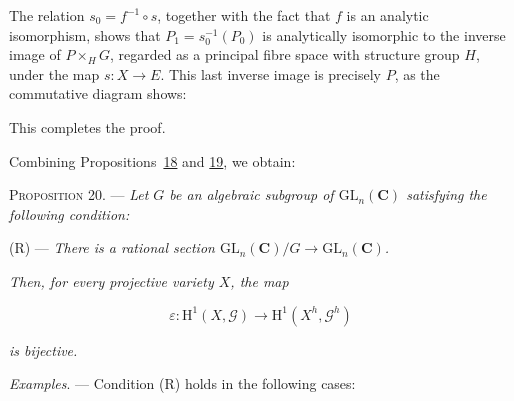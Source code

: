 The relation $s_0=f^{-1}\circ s$, together with the fact that $f$ is an
analytic isomorphism, shows that $P_1=s_0^{-1}(P_0)$ is analytically
isomorphic to the inverse image of $P\times_HG$, regarded as a principal
fibre space with structure group $H$, under the map $s:X\to E$. This last
inverse image is precisely $P$, as the commutative diagram shows:

\begin{center}
\end{center}

This completes the proof.

Combining Propositions~\hyperref[gaga:prop:18]{18} and
\hyperref[gaga:prop:19]{19}, we obtain:

\textsc{Proposition 20}. --- \emph{Let $G$ be an
algebraic subgroup of $\mathrm{GL}_n(\mathbf{C})$ satisfying the following
condition:}

(R) --- \emph{There is a rational section
$\mathrm{GL}_n(\mathbf{C})/G\to\mathrm{GL}_n(\mathbf{C})$.}

\emph{Then, for every projective variety $X$, the map}

\begin{equation*}
\varepsilon:\mathrm{H}^1(X,\mathcal{G})
\longrightarrow\mathrm{H}^1(X^h,\mathcal{G}^h)
\end{equation*}

\emph{is bijective.}

\emph{Examples}. --- Condition (R) holds in the following cases:


